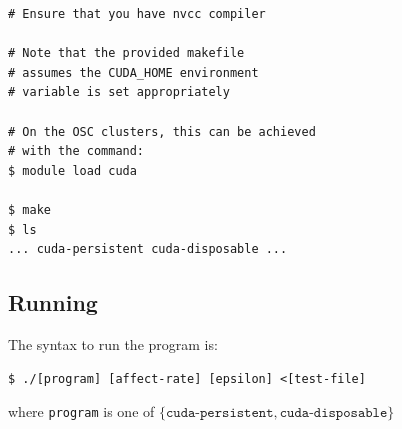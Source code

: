 \documentclass{article}
\begin{document}
\begin{lstlisting}[style=DOS]
# Ensure that you have nvcc compiler

# Note that the provided makefile
# assumes the CUDA_HOME environment
# variable is set appropriately

# On the OSC clusters, this can be achieved
# with the command:
$ module load cuda

$ make
$ ls
... cuda-persistent cuda-disposable ...
\end{lstlisting}

\subsection*{Running}
\label{subsec:running}

The syntax to run the program is:

\begin{lstlisting}[style=DOS]
$ ./[program] [affect-rate] [epsilon] <[test-file]
\end{lstlisting}
where \texttt{program} is one of $\{\texttt{cuda-persistent}, \texttt{cuda-disposable}\}$
\end{document}
